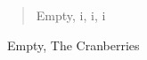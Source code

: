 \documentclass{article}
\begin{document}
\begin{quote}
    Empty, i, i, i
\end{quote}~Empty, The Cranberries
\end{document}

